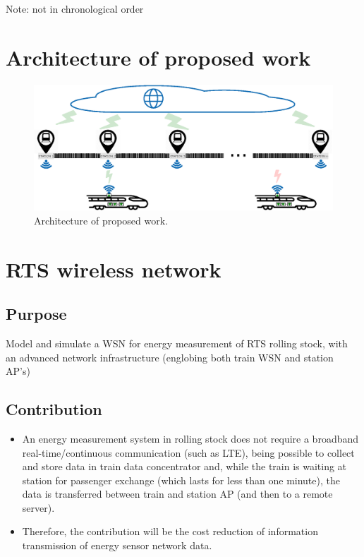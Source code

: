 
Note: not in chronological order

\section{Architecture of proposed work}

\begin{figure}[h!]
	\centering
	\includegraphics[width=1.0\textwidth,keepaspectratio]{figures/architecture}
	\caption{Architecture of proposed work.}
	\label{fig:architecture}
\end{figure}


\section{RTS wireless network}


\subsection{Purpose}
Model and simulate a WSN for energy measurement of RTS rolling stock, with an advanced network infrastructure (englobing both train WSN and station AP’s)

\subsection{Contribution}

\begin{itemize}
	\setlength\itemsep{1em}
	\item An energy measurement system in rolling stock does not require a broadband real-time/continuous communication (such as LTE), being possible to collect and store data in train data concentrator and, while the train is waiting at station for passenger exchange (which lasts for less than one minute), the data is transferred between train and station AP (and then to a remote server).
	
	\item Therefore, the contribution will be the cost reduction of information transmission of energy sensor network data.
\end{itemize}


